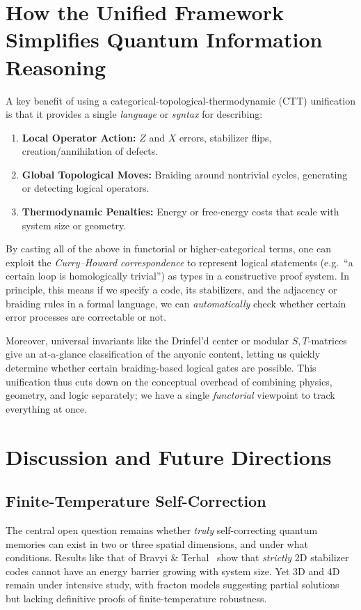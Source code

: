 \documentclass[12pt]{article}
\begin{document}
\section{How the Unified Framework Simplifies Quantum Information Reasoning}\label{sec:how_unification_helps}
A key benefit of using a categorical-topological-thermodynamic (CTT) unification is that it provides a single \emph{language} or \emph{syntax} for describing:
\begin{enumerate}
    \item \textbf{Local Operator Action:} $Z$ and $X$ errors, stabilizer flips, creation/annihilation of defects.
    \item \textbf{Global Topological Moves:} Braiding around nontrivial cycles, generating or detecting logical operators.
    \item \textbf{Thermodynamic Penalties:} Energy or free-energy costs that scale with system size or geometry.
\end{enumerate}
By casting all of the above in functorial or higher-categorical terms, one can exploit the \emph{Curry–Howard correspondence} to represent logical statements (e.g.\ “a certain loop is homologically trivial”) as types in a constructive proof system. In principle, this means if we specify a code, its stabilizers, and the adjacency or braiding rules in a formal language, we can \emph{automatically} check whether certain error processes are correctable or not. 

Moreover, universal invariants like the Drinfel’d center or modular $S,T$-matrices give an at-a-glance classification of the anyonic content, letting us quickly determine whether certain braiding-based logical gates are possible. This unification thus cuts down on the conceptual overhead of combining physics, geometry, and logic separately; we have a single \emph{functorial} viewpoint to track everything at once.

\section{Discussion and Future Directions}\label{sec:discussion_conclusion}

\subsection{Finite-Temperature Self-Correction}
The central open question remains whether \emph{truly} self-correcting quantum memories can exist in two or three spatial dimensions, and under what conditions. Results like that of Bravyi \& Terhal~\cite{bravyi2009no} show that \emph{strictly} 2D stabilizer codes cannot have an energy barrier growing with system size. Yet 3D and 4D remain under intensive study, with fracton models suggesting partial solutions but lacking definitive proofs of finite-temperature robustness.
\end{document}
